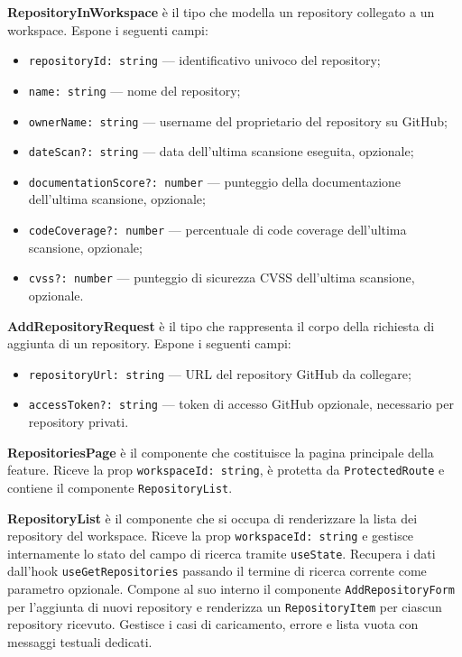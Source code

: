 \documentclass[a4paper, 11pt]{article}
\newcounter{subsubsubsection}[subsubsection]
\newcounter{subsubsubsubsection}[subsubsubsection]
\begin{document}
\textbf{RepositoryInWorkspace} è il tipo che modella un repository collegato a un workspace.
Espone i seguenti campi:
\begin{itemize}
  \item \texttt{repositoryId: string} — identificativo univoco del repository;
  \item \texttt{name: string} — nome del repository;
  \item \texttt{ownerName: string} — username del proprietario del repository su GitHub;
  \item \texttt{dateScan?: string} — data dell'ultima scansione eseguita, opzionale;
  \item \texttt{documentationScore?: number} — punteggio della documentazione dell'ultima
        scansione, opzionale;
  \item \texttt{codeCoverage?: number} — percentuale di code coverage dell'ultima scansione,
        opzionale;
  \item \texttt{cvss?: number} — punteggio di sicurezza CVSS dell'ultima scansione, opzionale.
\end{itemize}

\textbf{AddRepositoryRequest} è il tipo che rappresenta il corpo della richiesta di aggiunta
di un repository. Espone i seguenti campi:
\begin{itemize}
  \item \texttt{repositoryUrl: string} — URL del repository GitHub da collegare;
  \item \texttt{accessToken?: string} — token di accesso GitHub opzionale, necessario per
        repository privati.
\end{itemize}


\textbf{RepositoriesPage} è il componente che costituisce la pagina principale della feature.
Riceve la prop \texttt{workspaceId: string}, è protetta da \texttt{ProtectedRoute} e contiene
il componente \texttt{RepositoryList}.

\textbf{RepositoryList} è il componente che si occupa di renderizzare la lista dei repository
del workspace. Riceve la prop \texttt{workspaceId: string} e gestisce internamente lo stato
del campo di ricerca tramite \texttt{useState}. Recupera i dati dall'hook
\texttt{useGetRepositories} passando il termine di ricerca corrente come parametro opzionale.
Compone al suo interno il componente \texttt{AddRepositoryForm} per l'aggiunta di nuovi
repository e renderizza un \texttt{RepositoryItem} per ciascun repository ricevuto. Gestisce
i casi di caricamento, errore e lista vuota con messaggi testuali dedicati.
\end{document}
